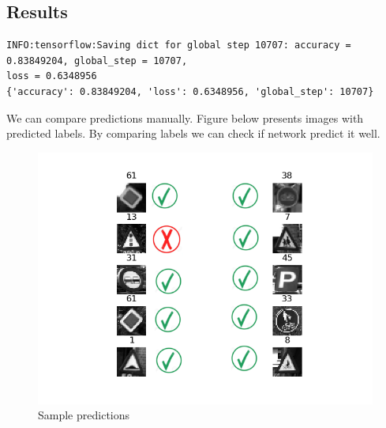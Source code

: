 \documentclass[]{report}
\begin{document}
\subsection{Results}
\begin{verbatim}INFO:tensorflow:Saving dict for global step 10707: accuracy = 0.83849204, global_step = 10707, 
loss = 0.6348956
{'accuracy': 0.83849204, 'loss': 0.6348956, 'global_step': 10707}
\end{verbatim}
We can compare predictions manually. Figure below presents images with predicted labels. By comparing labels we can check if network predict it well.
\begin{figure}[H]
\centerline{\includegraphics[scale=0.9]{sampleResult}}
\caption{Sample predictions}
\end{figure}
\end{document}
